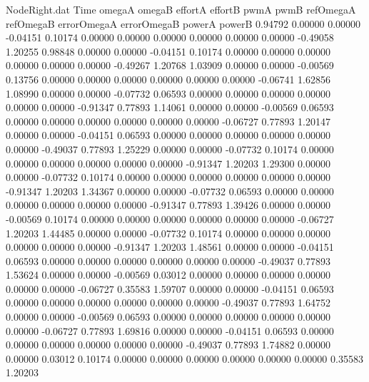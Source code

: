\begin{filecontents}{NodeRight.dat}
Time omegaA omegaB effortA effortB pwmA pwmB refOmegaA refOmegaB errorOmegaA errorOmegaB powerA powerB
   0.94792    0.00000    0.00000    -0.04151    0.10174    0.00000    0.00000    0.00000    0.00000    0.00000    0.00000   -0.49058    1.20255
   0.98848    0.00000    0.00000    -0.04151    0.10174    0.00000    0.00000    0.00000    0.00000    0.00000    0.00000   -0.49267    1.20768
   1.03909    0.00000    0.00000    -0.00569    0.13756    0.00000    0.00000    0.00000    0.00000    0.00000    0.00000   -0.06741    1.62856
   1.08990    0.00000    0.00000    -0.07732    0.06593    0.00000    0.00000    0.00000    0.00000    0.00000    0.00000   -0.91347    0.77893
   1.14061    0.00000    0.00000    -0.00569    0.06593    0.00000    0.00000    0.00000    0.00000    0.00000    0.00000   -0.06727    0.77893
   1.20147    0.00000    0.00000    -0.04151    0.06593    0.00000    0.00000    0.00000    0.00000    0.00000    0.00000   -0.49037    0.77893
   1.25229    0.00000    0.00000    -0.07732    0.10174    0.00000    0.00000    0.00000    0.00000    0.00000    0.00000   -0.91347    1.20203
   1.29300    0.00000    0.00000    -0.07732    0.10174    0.00000    0.00000    0.00000    0.00000    0.00000    0.00000   -0.91347    1.20203
   1.34367    0.00000    0.00000    -0.07732    0.06593    0.00000    0.00000    0.00000    0.00000    0.00000    0.00000   -0.91347    0.77893
   1.39426    0.00000    0.00000    -0.00569    0.10174    0.00000    0.00000    0.00000    0.00000    0.00000    0.00000   -0.06727    1.20203
   1.44485    0.00000    0.00000    -0.07732    0.10174    0.00000    0.00000    0.00000    0.00000    0.00000    0.00000   -0.91347    1.20203
   1.48561    0.00000    0.00000    -0.04151    0.06593    0.00000    0.00000    0.00000    0.00000    0.00000    0.00000   -0.49037    0.77893
   1.53624    0.00000    0.00000    -0.00569    0.03012    0.00000    0.00000    0.00000    0.00000    0.00000    0.00000   -0.06727    0.35583
   1.59707    0.00000    0.00000    -0.04151    0.06593    0.00000    0.00000    0.00000    0.00000    0.00000    0.00000   -0.49037    0.77893
   1.64752    0.00000    0.00000    -0.00569    0.06593    0.00000    0.00000    0.00000    0.00000    0.00000    0.00000   -0.06727    0.77893
   1.69816    0.00000    0.00000    -0.04151    0.06593    0.00000    0.00000    0.00000    0.00000    0.00000    0.00000   -0.49037    0.77893
   1.74882    0.00000    0.00000     0.03012    0.10174    0.00000    0.00000    0.00000    0.00000    0.00000    0.00000    0.35583    1.20203

\end{filecontents}

